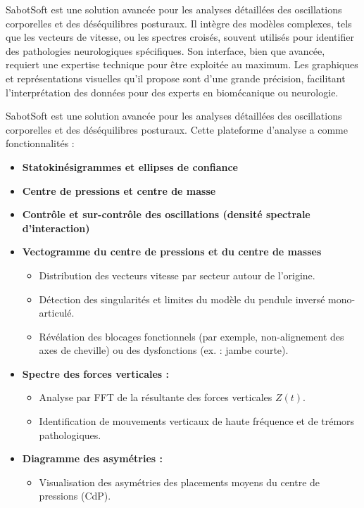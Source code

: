 SabotSoft est une solution avancée pour les analyses détaillées des oscillations 
corporelles et des déséquilibres posturaux. Il intègre des modèles complexes, 
tels que les vecteurs de vitesse, ou les spectres croisés, souvent utilisés pour 
identifier des pathologies neurologiques spécifiques. Son interface, bien que avancée,
requiert une expertise technique pour être exploitée au maximum. 
Les graphiques et représentations visuelles qu’il propose sont d’une grande précision,
facilitant l’interprétation des données pour des experts en biomécanique ou 
neurologie.

SabotSoft est une solution avancée pour les analyses détaillées 
des oscillations corporelles et des déséquilibres posturaux. 
Cette plateforme d’analyse a comme fonctionnalités : 

\begin{itemize}
    \item \textbf {Statokinésigrammes et ellipses de confiance} 
    \item \textbf {Centre de pressions et centre de masse} 
    \item \textbf {Contrôle et sur-contrôle des oscillations (densité spectrale d’interaction)}
    \item \textbf {Vectogramme du centre de pressions et du centre de masses}
    \begin{itemize}
        \item Distribution des vecteurs vitesse par secteur autour de l’origine.
        \item Détection des singularités et limites du modèle du pendule inversé mono-articulé.
        \item Révélation des blocages fonctionnels (par exemple, non-alignement des axes de cheville) ou des dysfonctions (ex. : jambe courte).
    \end{itemize} 
    \item \textbf{Spectre des forces verticales :}
    \begin{itemize}
    \item Analyse par FFT de la résultante des forces verticales $Z(t)$.
    \item Identification de mouvements verticaux de haute fréquence et de trémors pathologiques.
    \end{itemize}
    \item \textbf{Diagramme des asymétries :}
    \begin{itemize}
    \item Visualisation des asymétries des placements moyens du centre de pressions (CdP).

\end{itemize}
\end{itemize}
